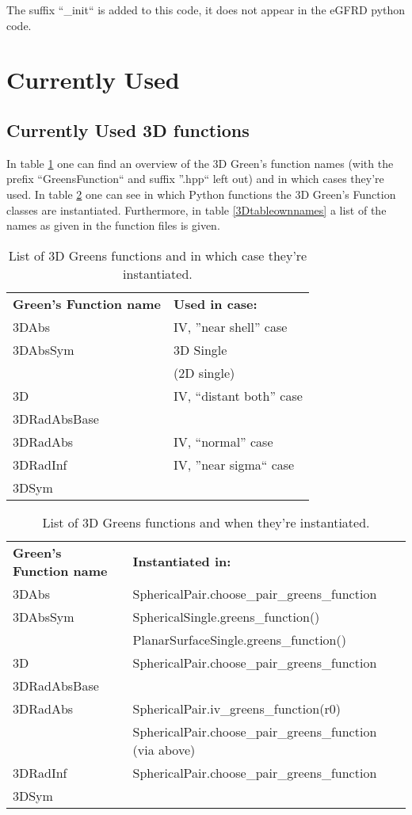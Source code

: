 \documentclass[a4paper,10pt]{article}
\begin{document}
The suffix ``\_init`` is added to this code, it does not appear in the eGFRD python code.


\section{Currently Used}

\subsection{Currently Used 3D functions}

In table \ref{3Dtable} one can find an overview of the 3D Green's function names (with the prefix ``GreensFunction`` and suffix ''.hpp`` left out) and in which cases they're used. In table \ref{3Dtableinst} one can see in which Python functions the 3D Green's Function classes are instantiated. Furthermore, in table \ref{3Dtableownnames} a list of the names as given in the function files is given.

\begin{table}[h!]
\caption{List of 3D Greens functions and in which case they're instantiated.}
\label{3Dtable}
\begin{tabular}{ p{} p{} }
  \textbf{Green's Function name} & \textbf{Used in case:} \\
3DAbs 		& IV, ''near shell'' case\\
3DAbsSym 	& 3D Single  \\
		& (2D single) \\
3D 		& IV, ``distant both'' case\\
3DRadAbsBase 	& \\
3DRadAbs	& IV, ``normal'' case\\
3DRadInf 	& IV, ''near sigma`` case\\
3DSym 		& \\
\end{tabular}
\end{table}

\begin{table}[h!]
\caption{List of 3D Greens functions and when they're instantiated.}
\label{3Dtableinst}
\begin{tabular}{ p{} p{} }
  \textbf{Green's Function name} & \textbf{Instantiated in:} \\
3DAbs 		& SphericalPair.choose\_pair\_greens\_function\\
3DAbsSym 	& SphericalSingle.greens\_function()\\
		& PlanarSurfaceSingle.greens\_function()\\
3D 		& SphericalPair.choose\_pair\_greens\_function\\
3DRadAbsBase 	& \\
3DRadAbs	& SphericalPair.iv\_greens\_function(r0)\\
		& SphericalPair.choose\_pair\_greens\_function (via above)\\
3DRadInf 	& SphericalPair.choose\_pair\_greens\_function\\
3DSym 		& \\
\end{tabular}
\end{table}
\end{document}
